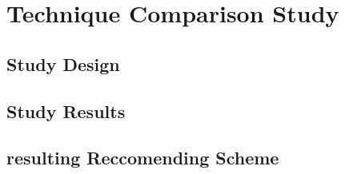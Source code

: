 \documentclass[\myrootdir/main.tex]{subfiles}
\begin{document}
\chapter{Technique Comparison Study}
\label{evaluation}

\section{Study Design}

\section{Study Results}

\section{resulting Reccomending Scheme}
\end{document}
